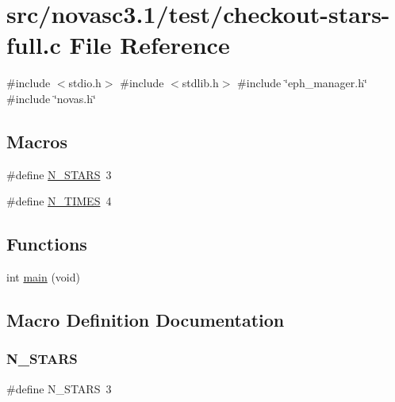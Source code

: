 \hypertarget{checkout-stars-full_8c}{}\section{src/novasc3.1/test/checkout-\/stars-\/full.c File Reference}
\label{checkout-stars-full_8c}
{\ttfamily \#include $<$stdio.\+h$>$}\newline
{\ttfamily \#include $<$stdlib.\+h$>$}\newline
{\ttfamily \#include \char`\"{}eph\+\_\+manager.\+h\char`\"{}}\newline
{\ttfamily \#include \char`\"{}novas.\+h\char`\"{}}\newline
\subsection*{Macros}
\begin{DoxyCompactItemize}
\item 
\#define \mbox{\hyperlink{checkout-stars-full_8c_abe06342406a249e65b2c523ce1d903e1}{N\+\_\+\+S\+T\+A\+RS}}~3
\item 
\#define \mbox{\hyperlink{checkout-stars-full_8c_af0c96fa4c13709446e360bb80e2ddc45}{N\+\_\+\+T\+I\+M\+ES}}~4
\end{DoxyCompactItemize}
\subsection*{Functions}
\begin{DoxyCompactItemize}
\item 
int \mbox{\hyperlink{checkout-stars-full_8c_a840291bc02cba5474a4cb46a9b9566fe}{main}} (void)
\end{DoxyCompactItemize}


\subsection{Macro Definition Documentation}
\mbox{\label{checkout-stars-full_8c_abe06342406a249e65b2c523ce1d903e1}} 
\subsubsection{\texorpdfstring{N\+\_\+\+S\+T\+A\+RS}{N\_STARS}}
{\footnotesize\ttfamily \#define N\+\_\+\+S\+T\+A\+RS~3}

